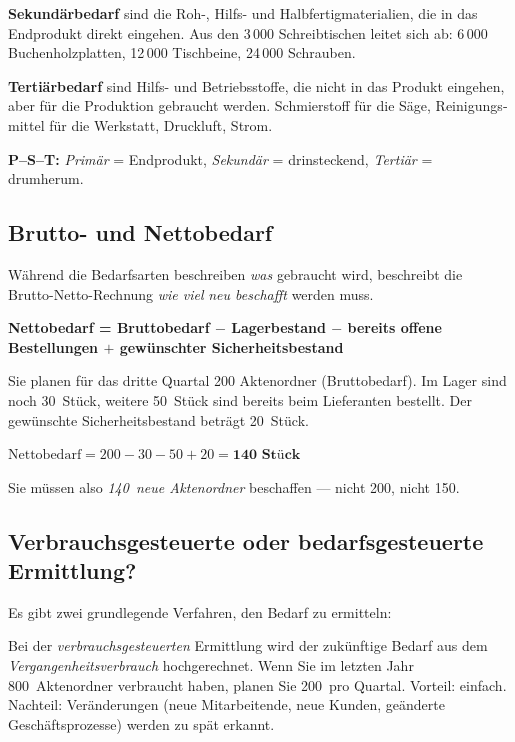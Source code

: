 \documentclass[11pt, a4paper]{article}
\begin{document}
\textbf{Sekundärbedarf} sind die Roh-, Hilfs- und Halbfertig­materialien, die in das
Endprodukt direkt eingehen. Aus den 3\,000 Schreibtischen leitet sich ab: 6\,000
Buchenholz­platten, 12\,000 Tischbeine, 24\,000 Schrauben.

\textbf{Tertiärbedarf} sind Hilfs- und Betriebsstoffe, die nicht in das Produkt eingehen,
aber für die Produktion gebraucht werden. Schmierstoff für die Säge, Reinigungs­mittel
für die Werkstatt, Druckluft, Strom.

\begin{eselsbruecke}
\textbf{P--S--T:} \emph{Primär} = Endprodukt, \emph{Sekundär} = drinsteckend,
\emph{Tertiär} = drumherum.
\end{eselsbruecke}

\subsection{Brutto- und Nettobedarf}

Während die Bedarfsarten beschreiben \emph{was} gebraucht wird, beschreibt die
Brutto-Netto-Rechnung \emph{wie viel} \emph{neu beschafft} werden muss.

\begin{merksatz}[title={Formel}]
\textbf{Nettobedarf = Bruttobedarf $-$ Lagerbestand $-$ bereits offene Bestellungen
$+$ gewünschter Sicherheits\-bestand}
\end{merksatz}

\begin{beispiel}
Sie planen für das dritte Quartal 200 Aktenordner (Bruttobedarf). Im Lager sind noch
30~Stück, weitere 50~Stück sind bereits beim Lieferanten bestellt. Der gewünschte
Sicherheits\-bestand beträgt 20~Stück.

\medskip
$\text{Nettobedarf} = 200 - 30 - 50 + 20 = \textbf{140 Stück}$

\medskip
Sie müssen also \emph{140~neue Aktenordner} beschaffen --- nicht 200, nicht 150.
\end{beispiel}

\subsection{Verbrauchsgesteuerte oder bedarfsgesteuerte Ermittlung?}

Es gibt zwei grundlegende Verfahren, den Bedarf zu ermitteln:

Bei der \emph{verbrauchsgesteuerten} Ermittlung wird der zukünftige Bedarf aus dem
\emph{Vergangenheits­verbrauch} hochgerechnet. Wenn Sie im letzten Jahr 800~Aktenordner
verbraucht haben, planen Sie 200~pro Quartal. Vorteil: einfach. Nachteil: Veränderungen
(neue Mitarbeitende, neue Kunden, geänderte Geschäfts­prozesse) werden zu spät erkannt.
\end{document}
